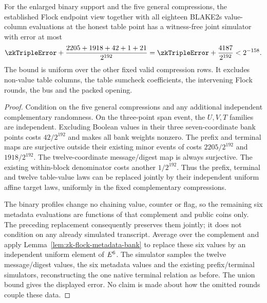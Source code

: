 \begin{theorem}\label{thm:zk-flock-metadata-endpoints}
For the enlarged binary support and the five general compressions, the established Flock endpoint view together with all eighteen BLAKE2s value-column evaluations at the honest table point has a witness-free joint simulator with error at most
\[
 \zkTripleError+\frac{2205+1918+42+1+21}{2^{192}}
 =\zkTripleError+\frac{4187}{2^{192}}<2^{-158}.
\]
The bound is uniform over the other fixed valid compression rows. It excludes non-value table columns, the table sumcheck coefficients, the intervening Flock rounds, the bus and the packed opening.
\end{theorem}
\begin{proof}
Condition on the five general compressions and any additional independent complementary randomness. On the three-point span event, the $U,V,T$ families are independent. Excluding Boolean values in their three seven-coordinate bank points costs $42/2^{192}$ and makes all bank weights nonzero. The prefix and terminal maps are surjective outside their existing minor events of costs $2205/2^{192}$ and $1918/2^{192}$. The twelve-coordinate message/digest map is always surjective. The existing within-block denominator costs another $1/2^{192}$. Thus the prefix, terminal and twelve table-value laws can be replaced jointly by their independent uniform affine target laws, uniformly in the fixed complementary compressions.

The binary profiles change no chaining value, counter or flag, so the remaining six metadata evaluations are functions of that complement and public coins only. The preceding replacement consequently preserves them jointly; it does not condition on any already simulated transcript. Average over the complement and apply Lemma~\ref{lem:zk-flock-metadata-bank} to replace these six values by an independent uniform element of $E^6$. The simulator samples the twelve message/digest values, the six metadata values and the existing prefix/terminal simulators, reconstructing the one native terminal relation as before. The union bound gives the displayed error. No claim is made about how the omitted rounds couple these data.
\end{proof}

